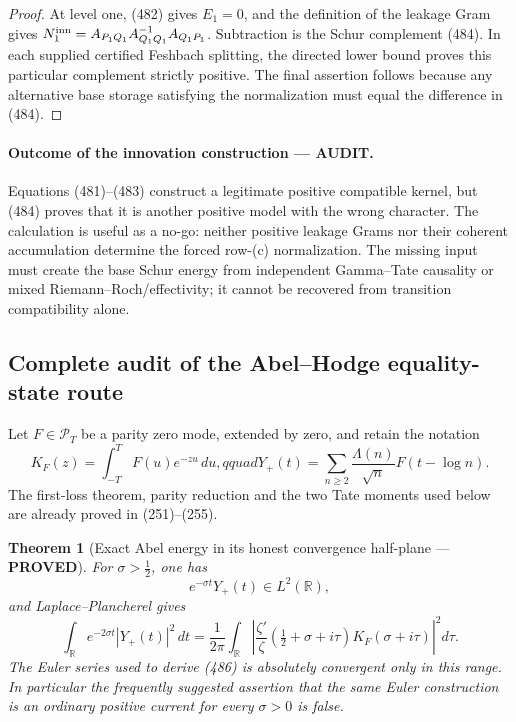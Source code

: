 \documentclass[11pt]{article}
\newtheorem{theorem}{Theorem}
\newcommand{\PROVED}{\textcolor{green!45!black}{\textbf{PROVED}}}
\newcommand{\AUDIT}{\textcolor{orange!75!black}{\textbf{AUDIT}}}
\begin{document}
\begin{proof}
At level one, (482) gives \(E_1=0\), and the definition of the leakage Gram
gives
\(N_1^{\rm inn}=A_{P_1Q_1}A_{Q_1Q_1}^{-1}A_{Q_1P_1}\).  Subtraction is
the Schur complement (484).  In each supplied certified Feshbach splitting,
the directed lower bound proves this particular complement strictly
positive.  The final assertion follows because any alternative base storage
satisfying the normalization must equal the difference in (484).
\end{proof}

\paragraph{Outcome of the innovation construction --- \AUDIT.}
Equations (481)--(483) construct a legitimate positive compatible kernel,
but (484) proves that it is another positive model with the wrong character.
The calculation is useful as a no-go: neither positive leakage Grams nor
their coherent accumulation determine the forced row-(c) normalization.
The missing input must create the base Schur energy from independent
Gamma--Tate causality or mixed Riemann--Roch/effectivity; it cannot be
recovered from transition compatibility alone.

\subsection{Complete audit of the Abel--Hodge equality-state route}

Let \(F\in\mathcal P_T\) be a parity zero mode, extended by zero, and retain
the notation
\[
 K_F(z)=\int_{-T}^{T}F(u)e^{-zu}\,du,qquad
 Y_+(t)=\sum_{n\ge2}\frac{\Lambda(n)}{\sqrt n}F(t-\log n).
\]
The first-loss theorem, parity reduction and the two Tate moments used below
are already proved in (251)--(255).

\begin{theorem}[Exact Abel energy in its honest convergence half-plane ---
\PROVED]
For \(\sigma>\frac12\), one has
\begin{equation}
 e^{-\sigma t}Y_+(t)\in L^2(\mathbb R),              \tag{485}
\end{equation}
and Laplace--Plancherel gives
\begin{equation}
 \boxed{
 \int_{\mathbb R}e^{-2\sigma t}|Y_+(t)|^2\,dt
 =\frac1{2\pi}\int_{\mathbb R}
 \left|\frac{\zeta'}{\zeta}
   (\tfrac12+\sigma+i\tau)K_F(\sigma+i\tau)\right|^2d\tau.}   \tag{486}
\end{equation}
The Euler series used to derive (486) is absolutely convergent only in this
range.  In particular the frequently suggested assertion that the same
Euler construction is an ordinary positive current for every \(\sigma>0\)
is false.
\end{theorem}
\end{document}
